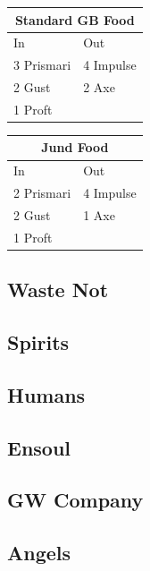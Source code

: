 \documentclass[12pt]{article}
\begin{document}
\begin{center}
    \begin{minipage}[t]{0.35\linewidth}
        \begin{center}
            \begin{tabular}{|l|l|}
                \multicolumn{2}{c}{\textbf{Standard GB Food}} \\
                \hline
                In         & Out                              \\
                \hline
                3 Prismari & 4 Impulse                        \\
                2 Gust     & 2 Axe                            \\
                1 Proft    &                                  \\
                \hline
            \end{tabular}
        \end{center}
    \end{minipage}
    \quad
    \begin{minipage}[t]{0.35\linewidth}
        \begin{center}
            \begin{tabular}{|l|l|}
                \multicolumn{2}{c}{\textbf{Jund Food}} \\
                \hline
                In         & Out                       \\
                \hline
                2 Prismari & 4 Impulse                 \\
                2 Gust     & 1 Axe                     \\
                1 Proft    &                           \\
                \hline
            \end{tabular}
        \end{center}
    \end{minipage}
\end{center}


\subsection{Waste Not}

\subsection{Spirits}

\subsection{Humans}

\subsection{Ensoul}

\subsection{GW Company}

\subsection{Angels}
\end{document}
